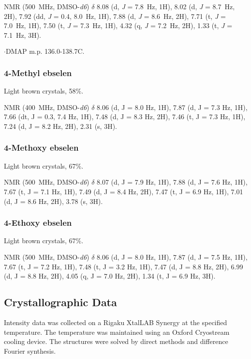 \begin{refsection}
 NMR (500~MHz, DMSO-\emph{d6}) $\delta$ 8.08 (d, \emph{J} = 7.8~Hz, 1H), 8.02 (d, \emph{J} = 8.7~Hz, 2H), 7.92 (dd, \emph{J} = 0.4, 8.0~Hz, 1H), 7.88 (d, \emph{J} = 8.6~Hz, 2H), 7.71 (t, \emph{J} = 7.0~Hz, 1H), 7.50 (t, \emph{J} = 7.3~Hz, 1H), 4.32 (q, \emph{J} = 7.2~Hz, 2H), 1.33 (t, \emph{J} = 7.1~Hz, 3H).

$\cdot$DMAP m.p. 136.0-138.7\degree C.

\subsubsection{4-Methyl ebselen }
Light brown crystals, 58\%.

 NMR (400~MHz, DMSO-\emph{d6}) $\delta$ 8.06 (d, J = 8.0 Hz, 1H), 7.87 (d, J = 7.3 Hz, 1H), 7.66 (dt, J = 0.3, 7.4 Hz, 1H), 7.48 (d, J = 8.3 Hz, 2H), 7.46 (t, J = 7.3 Hz, 1H), 7.24 (d, J = 8.2 Hz, 2H), 2.31 (s, 3H).

\subsubsection{4-Methoxy ebselen }
Light brown crystals, 67\%.

 NMR (500~MHz, DMSO-\emph{d6}) $\delta$ 8.07 (d, J = 7.9 Hz, 1H), 7.88 (d, J = 7.6 Hz, 1H), 7.67 (t, J = 7.1 Hz, 1H), 7.49 (d, J = 8.4 Hz, 2H), 7.47 (t, J = 6.9 Hz, 1H), 7.01 (d, J = 8.6 Hz, 2H), 3.78 (s, 3H).

\subsubsection{4-Ethoxy ebselen }
Light brown crystals, 67\%.

 NMR (500~MHz, DMSO-\emph{d6}) $\delta$ 8.06 (d, J = 8.0 Hz, 1H), 7.87 (d, J = 7.5 Hz, 1H), 7.67 (t, J = 7.2 Hz, 1H), 7.48 (t, J = 3.2 Hz, 1H), 7.47 (d, J = 8.8 Hz, 2H), 6.99 (d, J = 8.8 Hz, 2H), 4.05 (q, J = 7.0 Hz, 2H), 1.34 (t, J = 6.9 Hz, 3H).

\subsection{Crystallographic Data}
Intensity data was collected on a Rigaku XtalLAB Synergy at the specified temperature. The temperature was maintained using an Oxford Cryostream cooling device. The structures were solved by direct methods and difference Fourier synthesis.\autocite{Sheldrick2015}


\end{refsection}

